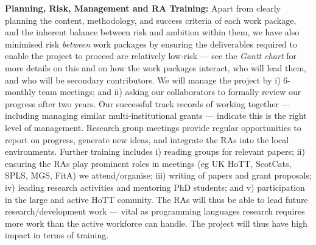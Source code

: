 \documentclass[a4paper,11pt]{article}
\begin{document}
{\bf Planning, Risk, Management and RA Training:} Apart from clearly
planning the content, methodology, and success criteria of each work
package, and the inherent balance between risk and ambition within
them, we have also minimised risk {\em between} work packages by
ensuring the deliverables required to enable the project to proceed
are relatively low-risk --- see the {\em Gantt chart} for more details on
this and on how the work packages interact, who will lead them, and
who will be secondary contributors. We will manage the project by i)
6-monthly team meetings; and ii) asking our collaborators to formally
review our progress after two years.  Our successful
track records of working together --- including managing similar
multi-institutional grants --- indicate this is the right level of
management. Research group meetings provide regular opportunities to
report on progress, generate new ideas, and integrate the RAs into the
local environments. Further training includes i) reading groups for
relevant papers; ii) ensuring the RAs play prominent roles in meetings
(eg UK HoTT, ScotCats, SPLS, MGS, FitA) we attend/organise; iii)
writing of papers and grant proposals; iv) leading research activities
and mentoring PhD students; and v) participation in the large and
active HoTT comunity. The RAs will thus be able to lead future
research/development work --- vital as programming languages research
requires more work than the active workforce can handle. The
project will thus have high impact in terms of training.







\begin{footnotesize}
\begin{multicols}{2}

%
%

\end{multicols}
\end{footnotesize}

% 
% 
\end{document}
